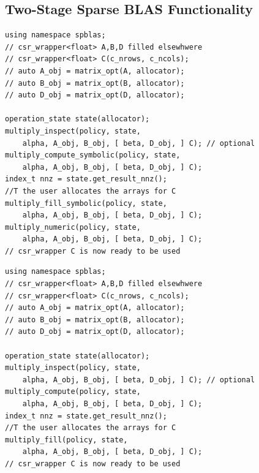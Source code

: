 


\subsection*{Two-Stage Sparse BLAS Functionality}


\begin{listing}[H]
\caption{Three-stage variant (with optional inspect phase) for the sparse matrix multiplication (SpGEMM) $C = \alpha \cdot \text{op}(A) \cdot \text{op}(B) [ + \beta \cdot D ]$.}
\begin{verbatim}
using namespace spblas;
// csr_wrapper<float> A,B,D filled elsewhwere
// csr_wrapper<float> C(c_nrows, c_ncols);
// auto A_obj = matrix_opt(A, allocator);
// auto B_obj = matrix_opt(B, allocator);
// auto D_obj = matrix_opt(D, allocator);

operation_state state(allocator);
multiply_inspect(policy, state, 
    alpha, A_obj, B_obj, [ beta, D_obj, ] C); // optional
multiply_compute_symbolic(policy, state, 
    alpha, A_obj, B_obj, [ beta, D_obj, ] C);
index_t nnz = state.get_result_nnz();
//T the user allocates the arrays for C
multiply_fill_symbolic(policy, state, 
    alpha, A_obj, B_obj, [ beta, D_obj, ] C);
multiply_numeric(policy, state, 
    alpha, A_obj, B_obj, [ beta, D_obj, ] C);
// csr_wrapper C is now ready to be used
\end{verbatim}
\end{listing}

\begin{listing}[H]
\caption{Two-stage variant (with optional inspect phase) for the sparse matrix multiplication (SpGEMM) $C = \alpha \cdot \text{op}(A) \cdot \text{op}(B) [ + \beta \cdot D ]$.}
\begin{verbatim}
using namespace spblas;
// csr_wrapper<float> A,B,D filled elsewhwere
// csr_wrapper<float> C(c_nrows, c_ncols);
// auto A_obj = matrix_opt(A, allocator);
// auto B_obj = matrix_opt(B, allocator);
// auto D_obj = matrix_opt(D, allocator);

operation_state state(allocator);
multiply_inspect(policy, state, 
    alpha, A_obj, B_obj, [ beta, D_obj, ] C); // optional
multiply_compute(policy, state, 
    alpha, A_obj, B_obj, [ beta, D_obj, ] C);
index_t nnz = state.get_result_nnz();
//T the user allocates the arrays for C
multiply_fill(policy, state, 
    alpha, A_obj, B_obj, [ beta, D_obj, ] C);
// csr_wrapper C is now ready to be used
\end{verbatim}
\end{listing}


